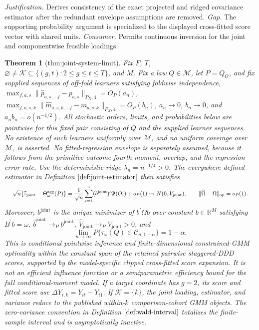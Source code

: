 \documentclass{article}
\newtheorem{theorem}{Theorem}
\begin{document}
\par\smallskip\noindent \textit{Justification.} Derives consistency of the exact projected and ridged covariance estimator after the redundant envelope assumptions are removed. \textit{Gap.} The supporting probability argument is specialized to the displayed cross-fitted score vector with shared units. \textit{Consumer.} Permits continuous inversion for the joint and componentwise feasible loadings.

\begin{theorem}[thm:joint-system-limit]\label{thm:joint-system-limit}
Fix \(F\), \(T\), \(\varnothing\ne\mathcal K\subseteq\{(g,t):2\le g\le t\le T\}\), and \(M\). Fix a law \(Q\in\mathcal M\), let \(P=Q_O\), and fix supplied sequences of off-fold learners satisfying foldwise independence, \(\max_{f,a,s}\|\widehat p_{a,s,-f}-p_{a,s}\|_{P_X,4}=O_P(a_n)\), \(\max_{f,a,s,k}\|\widehat m_{a,s,k,-f}-m_{a,s,k}\|_{P_X,4}=O_P(b_n)\), \(a_n\to0\), \(b_n\to0\), and \(a_nb_n=o(n^{-1/2})\). All stochastic orders, limits, and probabilities below are pointwise for this fixed pair consisting of \(Q\) and the supplied learner sequences. No existence of such learners uniformly over \(\mathcal M\), and no uniform coverage over \(\mathcal M\), is asserted. No fitted-regression envelope is separately assumed, because it follows from the primitive outcome fourth moment, overlap, and the regression error rate. Use the deterministic ridge \(\lambda_n=n^{-1/4}>0\). The everywhere-defined estimator in Definition \(\ref{def:joint-estimator}\) then satisfies
\[
\makebox[\linewidth][c]{\resizebox{0.98\linewidth}{!}{\(\displaystyle \sqrt n\{\widehat\tau_{\mathrm{joint}}-\Theta_\omega^{\mathrm{agg}}(P)\}
=\frac{1}{\sqrt n}\sum_{i=1}^n(b^{\mathrm{joint}})^{\prime}\Psi(O_i)+o_P(1)
\rightsquigarrow N(0,V_{\mathrm{joint}}),
\qquad
\|\widehat\Omega-\Omega\|_{\mathrm{op}}=o_P(1).\)}}
\]
Moreover, \(b^{\mathrm{joint}}\) is the unique minimizer of \(b^{\prime}\Omega b\) over constant \(b\in\mathbb R^M\) satisfying \(B^{\prime}b=\omega\), \(\widehat b^{\mathrm{joint}}\to_Pb^{\mathrm{joint}}\), \(\widehat V_{\mathrm{joint}}\to_PV_{\mathrm{joint}}>0\), and
\[
\lim_{n\to\infty}P\{\tau_\omega(Q)\in\mathcal C_{n,1-\alpha}\}=1-\alpha.
\]
This is conditional pointwise inference and finite-dimensional constrained-GMM optimality within the constant span of the retained pairwise staggered-DDD scores, supported by the model-specific clipped cross-fitted score expansion. It is not an efficient influence function or a semiparametric efficiency bound for the full conditional-moment model. If a target coordinate has \(g=2\), its score and fitted score use \(\Delta Y_{i,k}=Y_{it}-Y_{i1}\). If \(\mathcal K=\{k\}\), the joint loading, estimator, and variance reduce to the published within-\(k\) comparison-cohort GMM objects. The zero-variance convention in Definition \(\ref{def:wald-interval}\) totalizes the finite-sample interval and is asymptotically inactive.
\end{theorem}
\end{document}
